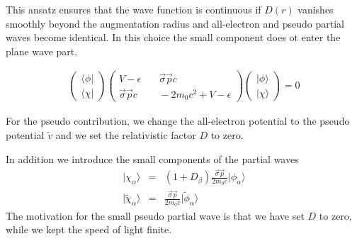 \documentclass[11pt,a4paper]{report}
\begin{document}
This ansatz ensures that the wave function is continuous if $D(r)$
vanishes smoothly beyond the augmentation radius and all-electron and
pseudo partial waves become identical. In this choice the small
component does ot enter the plane wave part.

\begin{eqnarray}
\left(\begin{array}{c}\langle\phi|\\
\langle\chi|\end{array}\right)
\left(\begin{array}{cc}
V-\epsilon &\quad \vec{\sigma}\vec{p}c\\
\vec{\sigma}\vec{p}c &\quad -2m_0c^2+V-\epsilon\end{array}\right)
\left(\begin{array}{c}|\phi\rangle\\|\chi\rangle\end{array}\right)=0
\end{eqnarray}


For the pseudo contribution, we change the all-electron potential to
the pseudo potential $\tilde{v}$ and we set the relativistic factor
$D$ to zero. 

In addition we introduce the small components of the partial waves 
\begin{eqnarray}
|\chi_\alpha\rangle&=&(1+D_\beta)\frac{\vec{\sigma}\vec{p}}{2m_0c}
|\phi_\alpha\rangle
\nonumber\\
|\tilde{\chi}_\alpha\rangle&=&\frac{\vec{\sigma}\vec{p}}{2m_0c}
|\tilde{\phi}_\alpha\rangle
\end{eqnarray}
The motivation for the small pseudo partial wave is that we have set
$D$ to zero, while we kept the speed of light finite.
\end{document}
